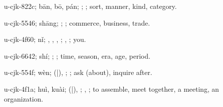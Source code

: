 \begin{multicols}{2}
{\cjkgGlue{}u-cjk-822c; bān, bō, pán; \cjkgGlue{}; \cjkgGlue{}; sort, manner, kind, category.

\cjkgGlue{}u-cjk-5546; shāng; \cjkgGlue{}\cjkgGlue{}\cjkgGlue{}; \cjkgGlue{}; commerce, business, trade.

\cjkgGlue{}u-cjk-4f60; nǐ; \cjkgGlue{}, \cjkgGlue{}, \cjkgGlue{}, \cjkgGlue{}; \cjkgGlue{}, \cjkgGlue{}; you.

\cjkgGlue{}u-cjk-6642; shí; \cjkgGlue{}; \cjkgGlue{}; time, season, era, age, period.

\cjkgGlue{}u-cjk-554f; wèn; \cjkgGlue{}\cjkgGlue{}(\cjkgGlue{}|\cjkgGlue{}), \cjkgGlue{}; \cjkgGlue{}; ask (about), inquire after.

\cjkgGlue{}u-cjk-4f1a; huì, kuài; \cjkgGlue{}\cjkgGlue{}(\cjkgGlue{}|\cjkgGlue{}), \cjkgGlue{}\cjkgGlue{}\cjkgGlue{}; \cjkgGlue{}, \cjkgGlue{}; to assemble, meet together, a meeting, an organization.

}
\end{multicols}
